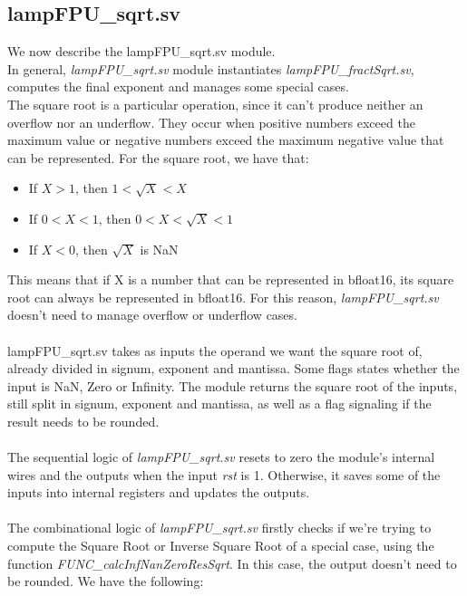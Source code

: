 \subsection{lampFPU\_sqrt.sv}
We now describe the lampFPU\_sqrt.sv module.\\
In general, \emph{lampFPU\_sqrt.sv} module instantiates \emph{lampFPU\_fractSqrt.sv}, computes the final exponent and manages some special cases. \\ 
The square root is a particular operation, since it can't produce neither an overflow nor an underflow. They occur when positive numbers exceed the maximum value or negative numbers exceed the maximum negative value that can be represented. For the square root, we have that:
\begin{itemize}
\item If $X > 1$, then $1 < \sqrt{X} < X$ 
\item If $0 < X < 1$, then $0 < X < \sqrt{X} < 1$
\item If $X < 0$, then $\sqrt{X}$ is NaN
\end{itemize}
This means that if X is a number that can be represented in bfloat16, its square root can always be represented in bfloat16. For this reason, \emph{lampFPU\_sqrt.sv} doesn't need to manage overflow or underflow cases.\\ \\
lampFPU\_sqrt.sv takes as inputs the operand we want the square root of, already divided in signum, exponent and mantissa. Some flags states whether the input is NaN, Zero or Infinity. The module returns the square root of the inputs, still split in signum, exponent and mantissa, as well as a flag signaling if the result needs to be rounded.\\\\
The sequential logic of \emph{lampFPU\_sqrt.sv} resets to zero the module's internal wires and the outputs when the input \emph{rst} is 1. Otherwise, it saves some of the inputs into internal registers and updates the outputs.\\\\
The combinational logic of \emph{lampFPU\_sqrt.sv} firstly checks if we're trying to compute the Square Root or Inverse Square Root of a special case, using the function \emph{FUNC\_calcInfNanZeroResSqrt}. In this case, the output doesn't need to be rounded. We have the following:
